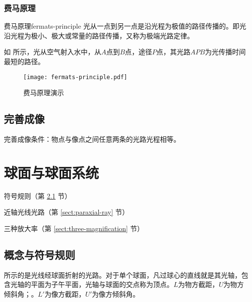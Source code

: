 \documentclass[cn,10pt,chinesefont=founder,math=newtx,cite=super,twoside]{elegantbook}
\begin{document}
\subsection{费马原理}

\begin{proposition}{费马原理}{fermats-principle}
	光从一点到另一点是沿光程为极值的路径传播的。即光沿光程为极小、极大或常量的路径传播，又称为极端光路定律。
\end{proposition}

如 所示，光从空气射入水中，从$A$点到$B$点，途径$P$点，其光路$APB$为光传播时间最短的路径。 

\begin{figure}[htbp]
	\centering
	\texttt{[image: fermats-principle.pdf]}
	\caption{费马原理演示}
	\label{fig:fermats-principle}
\end{figure}

\section{完善成像}
完善成像条件：物点与像点之间任意两条的光路光程相等。

\chapter{球面与球面系统}

\begin{introduction}
	\item 符号规则（第 \ref{sect:symbol-rules} 节）
	\item 近轴光线光路（第 \ref{sect:paraxial-ray} 节）
	\item 三种放大率（第 \ref{sect:three-magnification} 节）
\end{introduction}

\section{概念与符号规则}
\label{sect:symbol-rules}
 所示的是光线经球面折射的光路。对于单个球面，凡过球心的直线就是其光轴，包含光轴的平面为子午平面，光轴与球面的交点称为顶点。$L$为物方截距，$U$为物方倾斜角；。$L'$为像方截距，$U'$为像方倾斜角。
\end{document}
